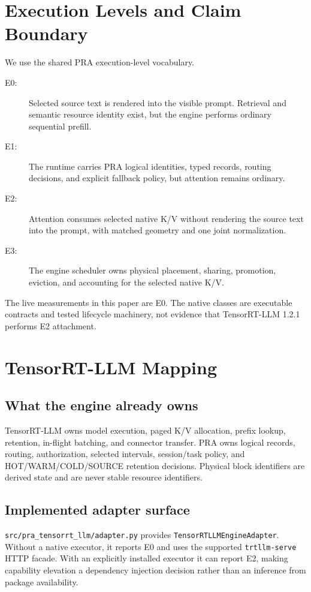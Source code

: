 \documentclass[10pt]{article}
\begin{document}
\section{Execution Levels and Claim Boundary}
We use the shared PRA execution-level vocabulary.
\begin{description}
\item[E0:] Selected source text is rendered into the visible prompt. Retrieval
  and semantic resource identity exist, but the engine performs ordinary
  sequential prefill.
\item[E1:] The runtime carries PRA logical identities, typed records, routing
  decisions, and explicit fallback policy, but attention remains ordinary.
\item[E2:] Attention consumes selected native K/V without rendering the source
  text into the prompt, with matched geometry and one joint normalization.
\item[E3:] The engine scheduler owns physical placement, sharing, promotion,
  eviction, and accounting for the selected native K/V.
\end{description}
The live measurements in this paper are E0. The native classes are executable
contracts and tested lifecycle machinery, not evidence that TensorRT-LLM 1.2.1
performs E2 attachment.

\section{TensorRT-LLM Mapping}
\subsection{What the engine already owns}
TensorRT-LLM owns model execution, paged K/V allocation, prefix lookup,
retention, in-flight batching, and connector transfer. PRA owns logical
records, routing, authorization, selected intervals, session/task policy, and
HOT/WARM/COLD/SOURCE retention decisions. Physical block identifiers are
derived state and are never stable resource identifiers.

\subsection{Implemented adapter surface}
\texttt{src/pra\_tensorrt\_llm/adapter.py} provides
\texttt{TensorRTLLMEngineAdapter}. Without a native executor, it reports E0 and
uses the supported \texttt{trtllm-serve} HTTP facade. With an explicitly
installed executor it can report E2, making capability elevation a dependency
injection decision rather than an inference from package availability.
\end{document}

